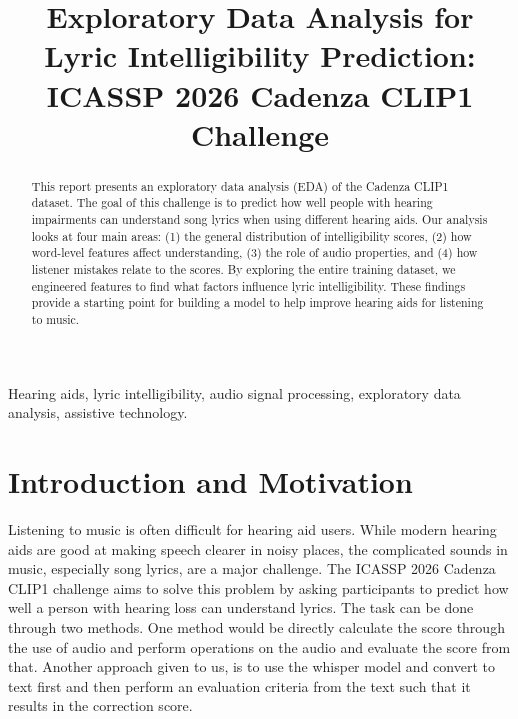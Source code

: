 \documentclass[conference]{IEEEtran}
\begin{document}
\title{Exploratory Data Analysis for Lyric Intelligibility Prediction:\\
ICASSP 2026 Cadenza CLIP1 Challenge}

\author{
    \and
    \and
    \and
}


\maketitle

\begin{abstract}
This report presents an exploratory data analysis (EDA) of the Cadenza CLIP1 dataset. The goal of this challenge is to predict how well people with hearing impairments can understand song lyrics when using different hearing aids. Our analysis looks at four main areas: (1) the general distribution of intelligibility scores, (2) how word-level features affect understanding, (3) the role of audio properties, and (4) how listener mistakes relate to the scores. By exploring the entire training dataset, we engineered features to find what factors influence lyric intelligibility. These findings provide a starting point for building a model to help improve hearing aids for listening to music.
\end{abstract}

\begin{IEEEkeywords}
Hearing aids, lyric intelligibility, audio signal processing, exploratory data analysis, assistive technology.
\end{IEEEkeywords}

\section{Introduction and Motivation}
Listening to music is often difficult for hearing aid users. While modern hearing aids are good at making speech clearer in noisy places, the complicated sounds in music, especially song lyrics, are a major challenge. The ICASSP 2026 Cadenza CLIP1 challenge aims to solve this problem by asking participants to predict how well a person with hearing loss can understand lyrics. The task can be done through two methods. One method would be directly calculate the score through the use of audio and perform operations on the audio and evaluate the score from that. Another approach given to us, is to use the whisper model and convert to text first and then perform an evaluation criteria from the text such that it results in the correction score.
\end{document}
